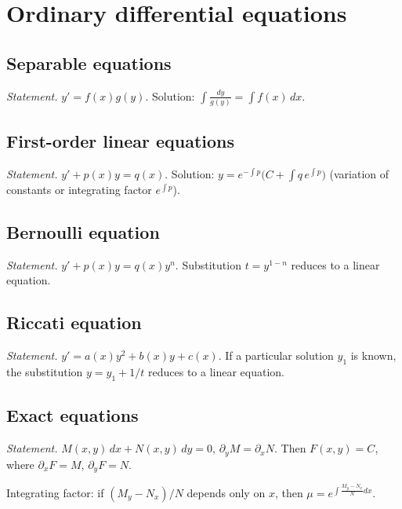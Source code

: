 \medskip

\section{Ordinary differential equations}
\label{sec:ode}

\subsection{Separable equations}
\label{subsec:ode-separable}

\textit{Statement.} $y' = f(x)g(y)$. Solution: $\displaystyle\int\frac{dy}{g(y)} = \int f(x)\,dx$.

\subsection{First-order linear equations}
\label{subsec:ode-linear}

\textit{Statement.} $y' + p(x)y = q(x)$. Solution: $y = e^{-\int p}\bigl(C + \int q\,e^{\int p}\bigr)$ (variation of constants or integrating factor $e^{\int p}$).

\subsection{Bernoulli equation}
\label{subsec:ode-bernoulli}

\textit{Statement.} $y' + p(x)y = q(x)y^n$. Substitution $t = y^{1-n}$ reduces to a linear equation.

\subsection{Riccati equation}
\label{subsec:ode-riccati}

\textit{Statement.} $y' = a(x)y^2 + b(x)y + c(x)$. If a particular solution $y_1$ is known, the substitution $y = y_1 + 1/t$ reduces to a linear equation.

\subsection{Exact equations}
\label{subsec:ode-exact}

\textit{Statement.} $M(x,y)\,dx + N(x,y)\,dy = 0$, $\partial_y M = \partial_x N$. Then $F(x,y)=C$, where $\partial_x F = M$, $\partial_y F = N$.

Integrating factor: if $(M_y-N_x)/N$ depends only on $x$, then $\mu = e^{\int\frac{M_y-N_x}{N}dx}$.

